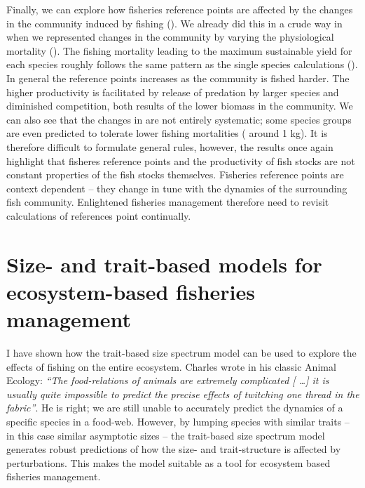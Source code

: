 Finally, we can explore how fisheries reference points are affected by the changes in the community induced by fishing ().  We already did this in a crude way in  when we represented changes in the community by varying the physiological mortality ().  The fishing mortality leading to the maximum sustainable yield {\Fmsy} for each species roughly follows the same pattern as the single species calculations ().  In general the reference points increases as the community is fished harder.  The higher productivity is facilitated by release of predation by larger species and diminished competition, both results of the lower biomass in the community.  We can also see that the changes in {\Fmsy} are not entirely systematic; some species groups are even predicted to tolerate lower fishing mortalities ({\W} around 1 kg).  It is therefore difficult to formulate general rules, however, the results once again highlight that fisheres reference points and the productivity of fish stocks are not constant properties of the fish stocks themselves. Fisheries reference points are context dependent -- they change in tune with the dynamics of the surrounding fish community.  Enlightened fisheries management therefore need to revisit calculations of references point continually.



\section{Size- and trait-based models for ecosystem-based fisheries management}
I have shown how the trait-based size spectrum model can be used to explore the effects of fishing on the entire ecosystem.  Charles \citet{Elton1927} wrote in his classic Animal Ecology: \emph{``The food-relations of animals are extremely complicated [ \ldots ] it is usually quite impossible to predict the precise effects of twitching one thread in the fabric''}.  He is right; we are still unable to accurately predict the dynamics of a specific species in a food-web.  However, by lumping species with similar traits -- in this case similar asymptotic sizes -- the trait-based size spectrum model generates robust predictions of how the size- and trait-structure is affected by perturbations.  This makes the model suitable as a tool for ecosystem based fisheries management.

